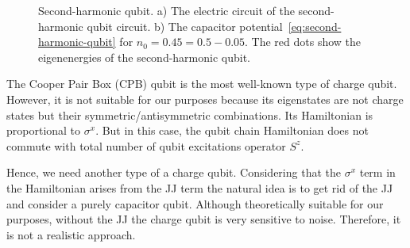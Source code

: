 \documentclass[reprint, aps, prx, amsmath, amssymb, longbibliography, superscriptaddress]{revtex4-2}
\begin{document}
\begin{figure}[t]
    \centering
     \hfill
    \caption{Second-harmonic qubit. a) The electric circuit of the second-harmonic qubit circuit. b) The capacitor potential~\eqref{eq:second-harmonic-qubit} for $n_0 = 0.45 = 0.5 - 0.05 $. The red dots show the eigenenergies of the second-harmonic qubit.}
    \label{fig:second-harmonic-qubit}
\end{figure}


The Cooper Pair Box (CPB) qubit is the most well-known type of charge qubit. However, it is not suitable for our purposes because its eigenstates are not charge states but their symmetric/antisymmetric combinations. Its Hamiltonian is proportional to $\sigma^x$. But in this case, the qubit chain Hamiltonian does not commute with total number of qubit excitations operator $S^z$.

Hence, we need another type of a charge qubit. Considering that the $\sigma^x$ term in the Hamiltonian arises from the JJ term the natural idea is to get rid of the JJ and consider a purely capacitor qubit. Although theoretically suitable for our purposes, without the JJ the charge qubit is very sensitive to noise. Therefore, it is not a realistic approach.
\end{document}
